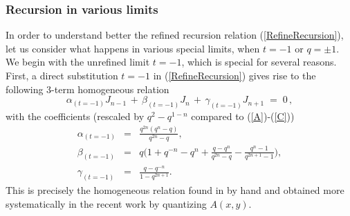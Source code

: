 \documentclass[hyper,letterpaper]{JHEP3}
\newcommand{\bea}{\begin{eqnarray}}
\newcommand{\eea}{\end{eqnarray}}
\newcommand{\be}{\begin{equation}}
\newcommand{\ee}{\end{equation}}
\begin{document}

\subsubsection{Recursion in various limits}

In order to understand better the refined recursion relation (\ref{RefineRecursion}),
let us consider what happens in various special limits, when $t=-1$ or $q=\pm 1$.
We begin with the unrefined limit $t=-1$, which is special for several reasons.
First, a direct substitution $\boxed{t=-1}$ in (\ref{RefineRecursion}) gives rise to the following 3-term homogeneous relation
\be
\alpha_{(t=-1)} J_{n-1} \, + \, \beta_{(t=-1)} J_n \, + \, \gamma_{(t=-1)} J_{n+1} \; = \; 0 \,,    \label{RefineRecursiont1}
\ee
with the coefficients (rescaled by $q^2-q^{1-n}$ compared to (\ref{A})-(\ref{C}))
\bea
\alpha_{(t=-1)} & = & \frac{q^{2 n} (q^n - q)}{q^{2 n} - q}, \\
\beta_{(t=-1)} & = & q \Big(1 + q^{-n} - q^n +
\frac{q - q^n}{q^{2 n} - q} - \frac{q^n - 1}{ q^{2 n+1} - 1}  \Big),  \\
\gamma_{(t=-1)} & = & \frac{q - q^{-n}}{1 - q^{2 n+1}}.
\eea
This is precisely the homogeneous relation found in \cite{Garoufalidis} by hand
and obtained more systematically in the recent work \cite{Tudor,abmodel} by quantizing $A(x,y)$.
\end{document}
